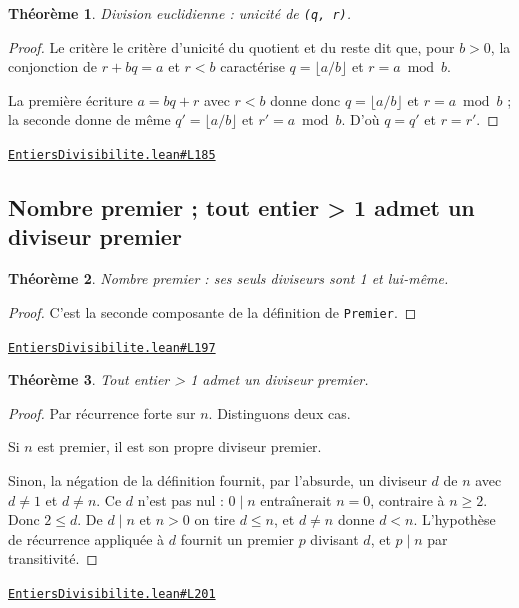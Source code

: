 \documentclass[11pt,a4paper]{article}
\theoremstyle{definition}
\theoremstyle{plain}
\newtheorem{theoreme}{Théorème}
\newcommand{\source}[2]{\par\smallskip\noindent\hfill{\footnotesize\href{#1}{\texttt{#2}}}\par\smallskip}
\begin{document}
\begin{theoreme}
Division euclidienne : unicité de \texttt{(q, r)}.
\end{theoreme}

\begin{proof}
Le critère le critère d'unicité du quotient et du reste dit que, pour $b > 0$, la conjonction de
$r + bq = a$ et $r < b$ caractérise $q = \lfloor a/b \rfloor$ et $r = a \bmod b$.

La première écriture $a = bq + r$ avec $r < b$ donne donc $q = \lfloor a/b \rfloor$ et
$r = a \bmod b$ ; la seconde donne de même $q' = \lfloor a/b \rfloor$ et
$r' = a \bmod b$. D'où $q = q'$ et $r = r'$.
\end{proof}
\source{https://github.com/Commutator-IO/learn-lean/blob/main/courses/01-college/01-nombres-et-calculs/EntiersDivisibilite.lean\#L185}{EntiersDivisibilite.lean\#L185}

\subsection{Nombre premier ; tout entier > 1 admet un diviseur premier}

\begin{theoreme}
Nombre premier : ses seuls diviseurs sont 1 et lui-même.
\end{theoreme}

\begin{proof}
C'est la seconde composante de la définition de \texttt{Premier}.
\end{proof}
\source{https://github.com/Commutator-IO/learn-lean/blob/main/courses/01-college/01-nombres-et-calculs/EntiersDivisibilite.lean\#L197}{EntiersDivisibilite.lean\#L197}

\begin{theoreme}
Tout entier > 1 admet un diviseur premier.
\end{theoreme}

\begin{proof}
Par récurrence forte sur $n$. Distinguons deux cas.

Si $n$ est premier, il est son propre diviseur premier.

Sinon, la négation de la définition fournit, par l'absurde, un diviseur $d$ de $n$ avec
$d \ne 1$ et $d \ne n$. Ce $d$ n'est pas nul : $0 \mid n$ entraînerait $n = 0$, contraire
à $n \ge 2$. Donc $2 \le d$. De $d \mid n$ et $n > 0$ on tire $d \le n$, et $d \ne n$
donne $d < n$. L'hypothèse de récurrence appliquée à $d$ fournit un premier $p$ divisant
$d$, et $p \mid n$ par transitivité.
\end{proof}
\source{https://github.com/Commutator-IO/learn-lean/blob/main/courses/01-college/01-nombres-et-calculs/EntiersDivisibilite.lean\#L201}{EntiersDivisibilite.lean\#L201}
\end{document}
